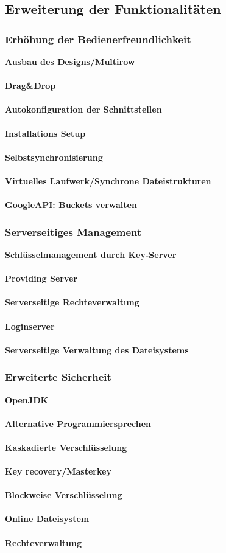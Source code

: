 \documentclass[12pt,a4paper,bibliography=totocnumbered,listof=totocnumbered]{scrartcl}
\begin{document}
\subsection{Erweiterung der Funktionalitäten}
\subsubsection{Erhöhung der Bedienerfreundlichkeit}
\textbf{Ausbau des Designs/Multirow}\\
\\\textbf{Drag\&Drop}\\
\\\textbf{Autokonfiguration der Schnittstellen}\\
\\\textbf{Installations Setup}\\
\\\textbf{Selbstsynchronisierung}\\
\\\textbf{Virtuelles Laufwerk/Synchrone Dateistrukturen}\\
\\\textbf{GoogleAPI: Buckets verwalten}\\

\subsubsection{Serverseitiges Management}
\textbf{Schlüsselmanagement durch Key-Server}\\
\\\textbf{Providing Server}\\
\\\textbf{Serverseitige Rechteverwaltung}\\
\\\textbf{Loginserver}\\
\\\textbf{Serverseitige Verwaltung des Dateisystems}\\

\subsubsection{Erweiterte Sicherheit}
\textbf{OpenJDK}\\
\\\textbf{Alternative Programmiersprechen}\\
\\\textbf{Kaskadierte Verschlüsselung}\\
\\\textbf{Key recovery/Masterkey}\\
\\\textbf{Blockweise Verschlüsselung}\\
\\\textbf{Online Dateisystem}\\
\\\textbf{Rechteverwaltung}\\
\end{document}
